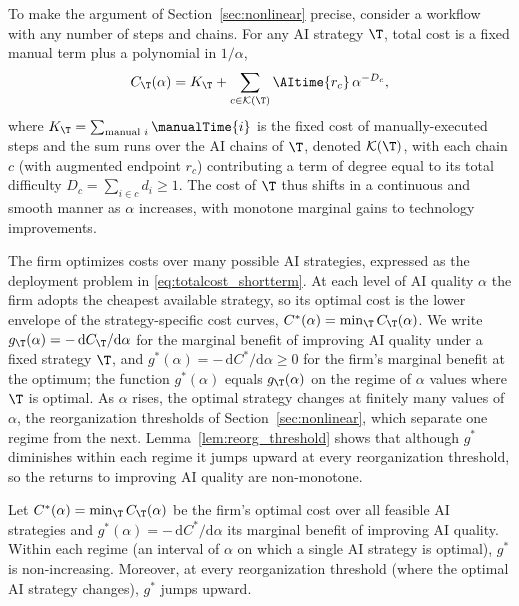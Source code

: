 To make the argument of Section~\ref{sec:nonlinear} precise, consider a workflow with any number of steps and chains.
For any AI strategy $\T$, total cost is a fixed manual term plus a polynomial in $1/\alpha$,
\begin{equation}
\label{eq:strategy_cost}
C_\T(\alpha) = K_\T + \sum_{c \in \mathcal{K}(\T)} \AItime{r_c}\,\alpha^{-D_c},
\end{equation}
where $K_\T = \sum_{\text{manual } i} \manualTime{i}$ is the fixed cost of manually-executed steps and the sum runs over the AI chains of $\T$, denoted $\mathcal{K}(\T)$, with each chain $c$ (with augmented endpoint $r_c$) contributing a term of degree equal to its total difficulty $D_c = \sum_{i \in c} d_i \ge 1$.
The cost of $\T$ thus shifts in a continuous and smooth manner as $\alpha$ increases, with monotone marginal gains to technology improvements.

The firm optimizes costs over many possible AI strategies, expressed as the deployment problem in \eqref{eq:totalcost_shortterm}.
At each level of AI quality $\alpha$ the firm adopts the cheapest available strategy, so its optimal cost is the lower envelope of the strategy-specific cost curves, $C^*(\alpha) = \min_{\T} C_\T(\alpha)$.
We write $g_\T(\alpha) = -\,\mathrm{d}C_\T/\mathrm{d}\alpha$ for the marginal benefit of improving AI quality under a fixed strategy $\T$, and $g^*(\alpha) = -\,\mathrm{d}C^*/\mathrm{d}\alpha \ge 0$ for the firm's marginal benefit at the optimum; the function $g^*(\alpha)$ equals $g_\T(\alpha)$ on the regime of $\alpha$ values where $\T$ is optimal.
As $\alpha$ rises, the optimal strategy changes at finitely many values of $\alpha$, the reorganization thresholds of Section~\ref{sec:nonlinear}, which separate one regime from the next.
Lemma~\ref{lem:reorg_threshold} shows that although $g^*$ diminishes within each regime it jumps upward at every reorganization threshold, so the returns to improving AI quality are non-monotone.

\begin{lem}
\label{lem:reorg_threshold}
Let $C^*(\alpha) = \min_{\T} C_\T(\alpha)$ be the firm's optimal cost over all feasible AI strategies and $g^*(\alpha) = -\,\mathrm{d}C^*/\mathrm{d}\alpha$ its marginal benefit of improving AI quality.
Within each regime (an interval of $\alpha$ on which a single AI strategy is optimal), $g^*$ is non-increasing.
Moreover, at every reorganization threshold (where the optimal AI strategy changes), $g^*$ jumps upward.
\end{lem}

